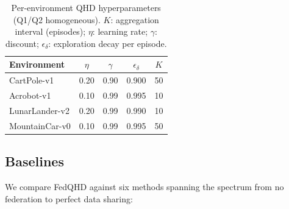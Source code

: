 \begin{table}[h]
  \centering
  \caption{Per-environment QHD hyperparameters (Q1/Q2 homogeneous). $K$: aggregation interval (episodes); $\eta$: learning rate; $\gamma$: discount; $\epsilon_\delta$: exploration decay per episode.}
  \label{tab:hparams}
  \setlength{\tabcolsep}{5pt}
  \begin{tabular}{lcccc}
  \toprule
  Environment & $\eta$ & $\gamma$ & $\epsilon_\delta$ & $K$ \\
  \midrule
  CartPole-v1    & 0.20 & 0.90 & 0.900 & 50 \\
  Acrobot-v1     & 0.10 & 0.99 & 0.995 & 10 \\
  LunarLander-v2 & 0.20 & 0.99 & 0.990 & 10 \\
  MountainCar-v0 & 0.10 & 0.99 & 0.995 & 50 \\
  \bottomrule
  \end{tabular}
\end{table}

\subsection{Baselines}
\label{subsec:baselines}

We compare FedQHD against six methods spanning the spectrum from no federation to perfect data sharing:

